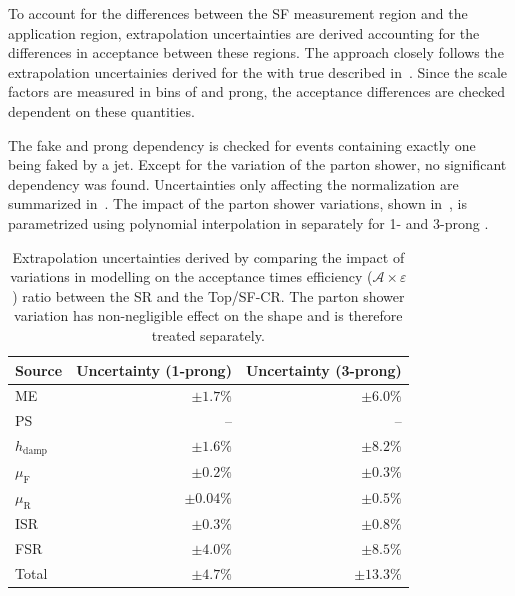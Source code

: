 To account for the differences between the SF measurement region and
the application region, extrapolation uncertainties are derived
accounting for the differences in acceptance between these regions.
The approach closely follows the extrapolation uncertainies derived
for the \ttbar with true \tauhad described
in~.  Since the scale
factors are measured in bins of \tauhad \pT and prong, the acceptance
differences are checked dependent on these quantities.

The fake \tauhad \pT and prong dependency is checked for events
containing exactly one \tauhad being faked by a jet. Except for the
variation of the parton shower, no significant \pT dependency was
found. Uncertainties only affecting the normalization are summarized
in~. The impact of the
parton shower variations, shown
in~, is parametrized using
polynomial interpolation in \tauhad \pT separately for 1- and 3-prong
\tauhad.

\begin{table}[htb]
  \centering

  \begin{tabular}{lrr}
    \toprule
    Source & Uncertainty (1-prong) & Uncertainty (3-prong)\\
    \midrule
    ME & $\pm 1.7 \%$ & $\pm 6.0 \%$ \\
    PS & -- & -- \\
    $h_\text{damp}$ & $\pm 1.6 \%$ & $\pm 8.2 \%$ \\
    $\mu_\text{F}$ & $\pm  0.2 \%$ & $\pm 0.3 \%$ \\
    $\mu_\text{R}$ & $\pm 0.04 \%$ &  $\pm 0.5 \%$ \\
    ISR & $\pm 0.3 \%$ & $\pm 0.8 \%$ \\
    FSR & $\pm 4.0 \%$ & $\pm 8.5 \%$ \\
    \midrule
    Total & $\pm 4.7 \%$ & $\pm 13.3 \%$\\
    \bottomrule
  \end{tabular}
  \caption{Extrapolation uncertainties derived by comparing the impact
    of variations in \ttbar modelling on the acceptance times
    efficiency ($\mathcal{A} \times \varepsilon$) ratio between the
    \hadhad SR and the \lephad Top/SF-CR. The parton shower variation
    has non-negligible effect on the \tauhad \pT shape and is
    therefore treated separately.}
  \label{tab:ttbar_fake_sf_extrapol_uncertainties}
\end{table}

